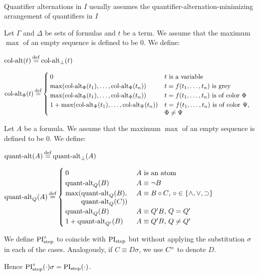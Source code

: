 \documentclass[,%
	draft=false,%
	numbers=noendperiod
	12pt,
	a4paper,
	oneside,%
	openany,
]{memoir}
\begin{document}
~

Quantifier alternations in $I$ usually assumes the quantifier-alternation-minimizing arrangement of quantifiers in $I$ 



\begin{defi}
	Let $\Gamma$ and $\Delta$ be sets of formulas and $t$ be a term.
	We assume that the maximum $\max$ of an empty sequence is defined to be $0$.
	We define:

	\noindent
	$\ca(t) \defeq \ca_\bot(t)$

	\noindent
	$
	\ca_\Phi(t) \defeq 
	\begin{cases}
		0 & \text{$t$ is a variable} \\
		\max(\ca_\Phi(t_1), \dots, \ca_\Phi(t_n)) & \text{$t = f(t_1, \dots, t_n)$ is grey} \\
		\max(\ca_\Phi(t_1), \dots, \ca_\Phi(t_n)) & \parbox[t]{0.4\textwidth}{$t = f(t_1, \dots, t_n)$ is of color $\Phi$} \\
		1 + \max(\ca_\Psi(t_1), \dots, \ca_\Psi(t_n)) & \parbox[t]{0.38\textwidth}{$t = f(t_1, \dots, t_n)$ is of color $\Psi$, $\Phi \neq \Psi$} \\
	\end{cases}
	$
\end{defi}


\begin{defi}
	Let $A$ be a formula.
	We assume that the maximum $\max$ of an empty sequence is defined to be $0$.
	We define:

	\noindent
	$\qa(A) \defeq \qa_\bot(A)$
	\nopagebreak

	\noindent
	$
	\qa_Q(A) \defeq 
	\begin{cases}
		0 & \text{$A$ is an atom} \\
		\qa_Q(B) & \text{$A \equiv \lnot B$} \\
		\max(\parbox[t]{0.2\textwidth}{$\qa_Q(B),$\newline$ \qa_Q(C))$} & \text{$A \equiv B \circ C$, $\circ \in \{\land, \lor, \limpl\}$} \\
		\qa_Q(B) & \text{$A \equiv Q' B$, $Q = Q'$} \\
		1+\qa_{Q'}(B) & \text{$A \equiv Q' B$, $Q \neq Q'$}  \\
	\end{cases}
	$
	\nopagebreak

	\qedhere
\end{defi}

\begin{defi}
	We define $\operatorname{PI}^{\circ}_{\mathrm{step}}$ to coincide with $\operatorname{PI}_{\mathrm{step}}$ but without applying the substitution $\sigma$ in each of the cases.
	Analogously, if $C \equiv D\sigma$, we use $C^\circ$ to denote $D$.
\end{defi}
Hence $\operatorname{PI}^{\circ}_{\mathrm{step}}(\cdot) \sigma = \operatorname{PI}_{\mathrm{step}}(\cdot)$.
\end{document}
